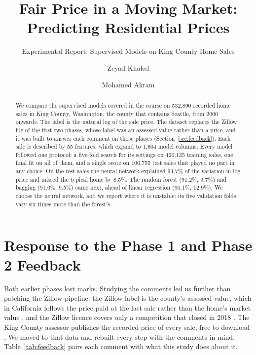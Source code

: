\documentclass[sigconf,nonacm,10pt]{acmart}
\begin{document}
\title{Fair Price in a Moving Market: Predicting Residential Prices}
\subtitle{Experimental Report: Supervised Models on King County Home Sales}

\author{Zeyad Khaled}

\author{Mohamed Akram}

\begin{abstract}
We compare the supervised models covered in the course on 532,890 recorded home sales in King County, Washington, the county that contains Seattle, from 2000 onwards. The label is the natural log of the sale price. The dataset replaces the Zillow file of the first two phases, whose label was an assessed value rather than a price, and it was built to answer each comment on those phases (Section~\ref{sec:feedback}). Each sale is described by 55 features, which expand to 1,604 model columns. Every model followed one protocol: a five-fold search for its settings on 426,135 training sales, one final fit on all of them, and a single score on 106,755 test sales that played no part in any choice. On the test sales the neural network explained 94.7\% of the variation in log price and missed the typical home by 8.5\%. The random forest (91.2\%, 9.7\%) and bagging (91.0\%, 9.5\%) came next, ahead of linear regression (90.1\%, 12.9\%). We choose the neural network, and we report where it is unstable: its five validation folds vary six times more than the forest's.
\end{abstract}


\maketitle

\section{Response to the Phase 1 and Phase 2 Feedback}
\label{sec:feedback}

Both earlier phases lost marks. Studying the comments led us further than patching the Zillow pipeline: the Zillow label is the county's assessed value, which in California follows the price paid at the last sale rather than the home's market value \cite{prop13}, and the Zillow licence covers only a competition that closed in 2018 \cite{zillowprize2017}. The King County assessor publishes the recorded price of every sale, free to download \cite{kcassessor}. We moved to that data and rebuilt every step with the comments in mind. Table~\ref{tab:feedback} pairs each comment with what this study does about it.
\end{document}
